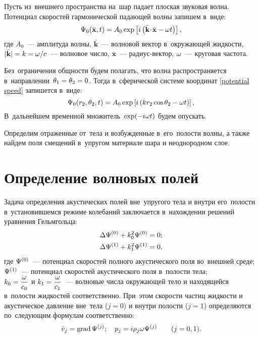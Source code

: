 Пусть из~внешнего пространства на~шар падает плоская звуковая волна. Потенциал скоростей гармонической падающей волны запишем в~виде:
\begin{equation}\label{potential speed}
\P_0(\bar{\mathbf{x}}, t) = A_0 \exp\left[i\left(\bar{\mathbf{k}}\dotm\bar{\mathbf{x}}-\om t\right)\right],
\end{equation}
где $A_0$~--- амплитуда волны, $\bar{\mathbf{k}}$~--- волновой вектор в~окружающей жидкости,  $\lvert\bar{\mathbf{k}}\rvert = k = \om / c$~--- волновое число, $\bar{\mathbf{x}}$~--- радиус-вектор, $\om$~--- круговая частота.

 Без~ограничения общности будем полагать, что волна распространяется в~направлении~$\Q_1 = \Q_2 = 0$. Тогда в~сферической системе координат \eqref{potential speed} запишется в~виде:
\begin{equation}
\P_0(r_2, \Q_2, t) = A_0 \exp\left[i\left(kr_2\cos\Q_2 - \om t\right)\right],
\end{equation}
В~дальнейшем временной множитель~$\exp(-i\om t)$ будем опускать.

Определим отраженные от~тела и возбужденные в~его~полости волны, а также найдем поля смещений в~упругом материале шара и неоднородном слое.

\section{Определение волновых полей}
Задача определения акустических полей вне~упругого тела и внутри его~полости в~установившемся режиме колебаний заключается в~нахождении решений уравнения Гельмгольца:
\begin{align}
\Lap\P^{(0)} &+ k_0^2\P^{(0)} = 0;\label{Helmholtz_ambient}\\
\Lap\P^{(1)} &+ k_1^2\P^{(1)} = 0,\label{Helmholtz_hollow}
\end{align}
где $\P^{(0)}$~--- потенциал скоростей полного акустического поля во~внешней среде;\\
$\P^{(1)}$~--- потенциал скоростей акустического поля в~полости тела;\\
$k_0 = \df{\om}{c_0}$ и $k_1 = \df{\om}{c_1}$~--- волновые числа окружающей тело и находящейся в~полости жидкостей соответственно. При~этом скорости частиц жидкости и акустическое давление вне~тела ($j = 0$) и внутри полости ($j = 1$) определяются по~следующим формулам соответственно:
\begin{equation}
\bar{v}_j = \grad\P^{(j)}; \q p_j = i\r_j\om\P^{(j)} \qq (j = 0, 1).
\end{equation}

